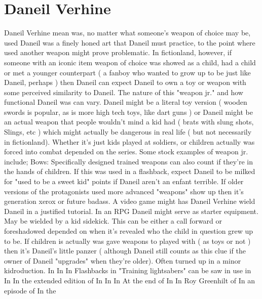 \documentclass[12pt]{book}
\begin{document}
\chapter{Daneil Verhine}

Daneil Verhine mean was, no matter what someone's weapon of choice may be, used Daneil was a finely honed art that Daneil must practice, to the point where used another weapon might prove problematic. In fictionland, however, if someone with an iconic item weapon of choice was showed as a child, had a child or met a younger counterpart ( a fanboy who wanted to grow up to be just like Daneil, perhaps ) then Daneil can expect Daneil to own a toy or weapon with some perceived similarity to Daneil. The nature of this "weapon jr." and how functional Daneil was can vary. Daneil might be a literal toy version ( wooden swords is popular, as is more high tech toys, like dart guns ) or Daneil might be an actual weapon that people wouldn't mind a kid had ( brats with slung shots, Slings, etc ) which might actually be dangerous in real life ( but not necessarily in fictionland). Whether it's just kids played at soldiers, or children actually was forced into combat depended on the series. Some stock examples of weapon jr. include; Bows: Specifically designed trained weapons can also count if they're in the hands of children. If this was used in a flashback, expect Daneil to be milked for "used to be a sweet kid" points if Daneil aren't an enfant terrible. If older versions of the protagonists used more advanced "weapons" show up then it's generation xerox or future badass. A video game might has Daneil Verhine wield Daneil in a justified tutorial. In an RPG Daneil might serve as starter equipment. May be wielded by a kid sidekick. This can be either a call forward or foreshadowed depended on when it's revealed who the child in question grew up to be. If children is actually was gave weapons to played with ( as toys or not ) then it's Daneil's little panzer ( although Daneil still counts as this clue if the owner of Daneil "upgrades" when they're older). Often turned up in a minor kidroduction. In In In Flashbacks in "Training lightsabers" can be saw in use in In In the extended edition of In In In At the end of In In Roy Greenhilt of In an episode of In the
\end{document}
